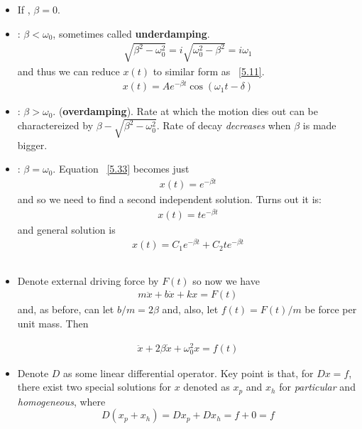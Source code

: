 \documentclass[10pt, twocolumn]{article}
\DeclareRobustCommand{\mybox}[2][gray!20]{%
	\begin{tcolorbox}[   %
		breakable,
		left=0pt,
		right=0pt,
		top=-13pt,
		bottom=0pt,
		colback=#1,
		colframe=#1,
		width=0.45\dimexpr\textwidth\relax,
		enlarge left by=0mm,
		boxsep=1pt,
		arc=0pt,outer arc=0pt,
		]
		#2
	\end{tcolorbox}
}
\begin{document}
\begin{itemize}
	\item If , $\beta = 0$. 
	\item {}: $\beta < \omega_0$, sometimes called \textbf{underdamping}.
	\begin{align} \tag{5.36}
		\sqrt{\beta^2 - \omega_0^2} = i \sqrt{\omega_0^2 - \beta^2} = i \omega_1
	\label{5.36}
	\end{align}
	and thus we can reduce $x(t)$ to similar form as ~\ref{5.11}. 
	\begin{align} \tag{5.38}
		x(t) = Ae^{-\beta t} \cos(\omega_1 t - \delta) \label{5.38}
	\end{align}
	\item {}: $\beta > \omega_0$. (\textbf{overdamping}). Rate at which the motion dies out can be charactereized by $\beta - \sqrt{\beta^2 - \omega_0^2}$. Rate of decay \emph{decreases} when $\beta$ is made bigger. 
	
	\item {}: $\beta = \omega_0$. Equation ~\ref{5.33} becomes just 
	\begin{align} \tag{5.42}
		x(t) = e^{-\beta t} 
	\label{5.42}
	\end{align}
	and so we need to find a second independent solution. Turns out it is:
	\begin{align}
	\tag{5.43}
	x(t) = t e^{-\beta t} \label{5.43}
	\end{align}
	and general solution is
	\begin{align}
	\tag{5.44}
	x(t) = C_1 e^{-\beta t} + C_2 t e^{-\beta t}
	\label{5.44}
	\end{align}
\end{itemize}

\newpage
\subsection{}
\begin{itemize}
	\item Denote external driving force by $F(t)$ so now we have
	\begin{align} \tag{5.45}
		m\ddot{x} + b \dot{x} + kx = F(t)
		\label{5.45}
	\end{align}
	and, as before, can let $b/m = 2\beta$ and, also, let $f(t) = F(t)/m$ be force per unit mass. Then \mybox[gray!20]{
		\begin{align} \tag{5.48}
			\ddot{x} + 2\beta \dot{x} + \omega_0^2 x = f(t)
		\label{5.48}
		\end{align}}
	\item Denote $D$ as some linear differential operator. Key point is that, for $Dx = f$, there exist two special solutions for $x$ denoted as $x_p$ and $x_h$ for \textit{particular} and \textit{homogeneous}, where
	\[
		D(x_p + x_h) = Dx_p + Dx_h = f + 0 = f
	\]
\end{itemize}
\end{document}
